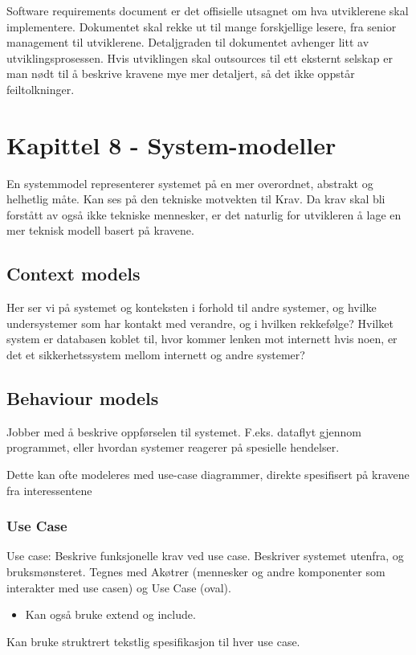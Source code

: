 \documentclass[11pt]{article}
\begin{document}
   Software requirements document er det offisielle utsagnet om hva utviklerene skal implementere. 
   Dokumentet skal rekke ut til mange forskjellige lesere, fra senior management til utviklerene.
   Detaljgraden til dokumentet avhenger litt av utviklingsprosessen. Hvis utviklingen skal outsources 
   til ett eksternt selskap er man nødt til å beskrive kravene mye mer detaljert, så det ikke oppstår feiltolkninger.
\section{Kapittel 8 - System-modeller}
\label{sec-7}

  En systemmodel representerer systemet på en mer overordnet, abstrakt og helhetlig måte. 
  Kan ses på den tekniske motvekten til Krav. Da krav skal bli forstått av også
  ikke tekniske mennesker, er det naturlig for utvikleren å lage en mer teknisk
  modell basert på kravene. 
  
\subsection{Context models}
\label{sec-7.1}

   
   Her ser vi på systemet og konteksten i forhold til andre systemer, og hvilke 
   undersystemer som har kontakt med verandre, og i hvilken rekkefølge? Hvilket system
   er databasen koblet til, hvor kommer lenken mot internett hvis noen, er det et 
   sikkerhetssystem mellom internett og andre systemer?
\subsection{Behaviour models}
\label{sec-7.2}

   Jobber med å beskrive oppførselen til systemet. F.eks. dataflyt gjennom programmet, 
   eller hvordan systemer reagerer på spesielle hendelser.

   Dette kan ofte modeleres med use-case diagrammer, direkte spesifisert på kravene
   fra interessentene
\subsubsection{Use Case}
\label{sec-7.2.1}

    Use case: Beskrive funksjonelle krav ved use case. Beskriver systemet utenfra, og bruksmønsteret. 
    Tegnes med Akøtrer (mennesker og andre komponenter som interakter med use casen) og Use Case (oval).
\begin{itemize}
\item Kan også bruke \label{extend}extend og \label{include}include.
\end{itemize}
    Kan bruke struktrert tekstlig spesifikasjon til hver use case.
\end{document}
